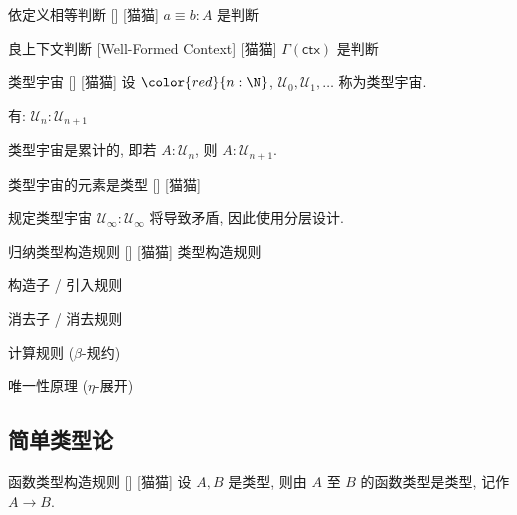 \documentclass[UTF8]{ctexart}
\begin{document}
        \begin{dfn}
            []
            {依定义相等判断}
            []
            [猫猫]
            \(a \equiv b:A\) 是判断
        \end{dfn}
        
        \begin{dfn}
            []
            {良上下文判断}
            [Well-Formed Context]
            [猫猫]
            \(\Gamma(\mathsf{ctx})\) 是判断
        \end{dfn}
        
        \begin{axm}
            []
            {类型宇宙}
            []
            [猫猫]
            设 \(\color{red}{n:\N}\), \(\mathcal{U}_0, \mathcal{U}_1, \dots\) 称为类型宇宙. 

            有: \(\mathcal{U}_n:\mathcal{U}_{n+1}\)

            类型宇宙是累计的, 即若 \(A:\mathcal{U}_n\), 则 \(A:\mathcal{U}_{n+1}\). 
        \end{axm}
        
        \begin{ppt}
            []
            {类型宇宙的元素是类型}
            []
            [猫猫]
        \end{ppt}
        
        \begin{rmk}
            规定类型宇宙 \(\mathcal{U}_{\infty}:\mathcal{U}_{\infty}\) 将导致矛盾, 因此使用分层设计. 
        \end{rmk}
        
        \begin{axm}
            []
            {归纳类型构造规则}
            []
            [猫猫]
            类型构造规则

            构造子 / 引入规则

            消去子 / 消去规则

            计算规则 ($\beta$-规约)

            唯一性原理 ($\eta$-展开)
        \end{axm}

    \subsection{简单类型论}
        
        \begin{axm}
            []
            {函数类型构造规则}
            []
            [猫猫]
            设 \(A, B\) 是类型, 则由 \(A\) 至 \(B\) 的函数类型是类型, 记作 \(A \to B\). 
        \end{axm}
        
\end{document}
